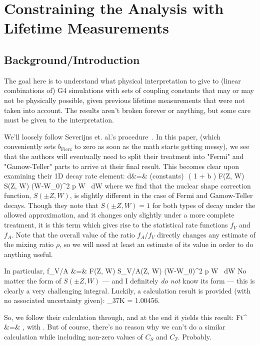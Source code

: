 
\chapter[How To Lifetime]{Constraining the Analysis with Lifetime Measurements}

\section[Intro]{Background/Introduction}

The goal here is to understand what physical interpretation to give to (linear combinations of) G4 simulations with sets of coupling constants that may or may not be physically possible, given previous lifetime measurements that were not taken into account.  The results aren't broken forever or anything, but some care must be given to the interpretation.  

We'll loosely follow Severijns et. al.'s procedure~\cite{SeverijnsTandecki2008}.  In this paper, (which conveniently sets $b_{\mathrm{Fierz}}$ to zero as soon as the math starts getting messy), we see that the authors will eventually need to split their treatment into "Fermi" and "Gamow-Teller" parts to arrive at their final result.  This becomes clear upon examining their 1D decay rate element:
\bea
d\Gamma &=& (\textrm{constants})\,\, \xi \left( 1 +  b \right) F(\pm Z, W) S(\pm Z, W) (W-W_0)^2 p W \, dW
\eea
where we find that the nuclear shape correction function, $S(\pm Z, W)$, is slightly different in the case of Fermi and Gamow-Teller decays.  Though they note that $S(\pm Z, W)=1$ for both types of decay under the allowed approximation, and it changes only slightly under a more complete treatment, it is this term which gives rise to the statistical rate functions $f_V$ and $f_A$.  Note that the overall value of the ratio $f_A/f_V$ directly changes any estimate of the mixing ratio $\rho$, so we will need at least an estimate of its value in order to do anything useful.  

In particular, 
\bea
f_{V/A} &=& \int F(\pm Z, W) S_{V/A}(\pm Z, W) (W-W_0)^2 p W \, dW
\eea
No matter the form of $S(\pm Z, W)$ --- and I definitely \emph{do not} know its form --- this is clearly a very challenging integral.  Luckily, a calculation result is provided (with no associated uncertainty given): 
\bea
{}  \biggm\lvert _{37K} = 1.00456.
\eea

So, we follow their calculation through, and at the end it yields this result:
\bea
Ft^{} &=& , 
\eea
with
\bea
\rho \approx {}.
\eea
But of course, there's no reason why we can't do a similar calculation while including non-zero values of $C_S$ and $C_T$.  Probably.

